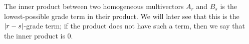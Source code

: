 \begin{definition}\label{d:inner-product1}
	The inner product between two homogeneous multivectors $A_r$ and $B_s$ is the lowest-possible grade term in their product. We will later see that this is the $\left|r-s\right|$-grade term; if the product does not have such a term, then we say that the inner product is 0.
\end{definition}
